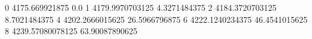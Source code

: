 0 4175.669921875 0.0
1 4179.9970703125 4.3271484375
2 4184.3720703125 8.7021484375
4 4202.2666015625 26.5966796875
6 4222.1240234375 46.4541015625
8 4239.57080078125 63.90087890625
